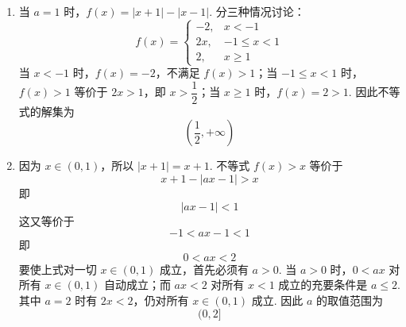\begin{solution}
\begin{enumerate}
\item 当 \(a=1\) 时，\(f(x)=|x+1|-|x-1|\). 分三种情况讨论：
\[
f(x)=
\begin{cases}
-2,&x<-1\\
2x,&-1\le x<1\\
2,&x\ge1
\end{cases}
\]
当 \(x<-1\) 时，\(f(x)=-2\)，不满足 \(f(x)>1\)；当 \(-1\le x<1\) 时，\(f(x)>1\) 等价于 \(2x>1\)，即 \(x>\dfrac12\)；当 \(x\ge1\) 时，\(f(x)=2>1\). 因此不等式的解集为
\[
\left(\frac12,+\infty\right)
\]

\item 因为 \(x\in(0,1)\)，所以 \(|x+1|=x+1\). 不等式 \(f(x)>x\) 等价于
\[
x+1-|ax-1|>x
\]
即
\[
|ax-1|<1
\]
这又等价于
\[
-1<ax-1<1
\]
即
\[
0<ax<2
\]
要使上式对一切 \(x\in(0,1)\) 成立，首先必须有 \(a>0\). 当 \(a>0\) 时，\(0<ax\) 对所有 \(x\in(0,1)\) 自动成立；而 \(ax<2\) 对所有 \(x<1\) 成立的充要条件是 \(a\le2\). 其中 \(a=2\) 时有 \(2x<2\)，仍对所有 \(x\in(0,1)\) 成立. 因此 \(a\) 的取值范围为
\[
(0,2]
\]
\end{enumerate}
\end{solution}
